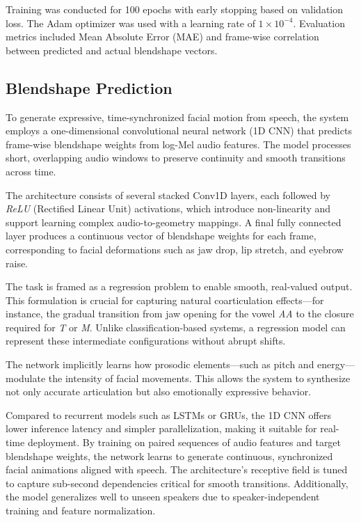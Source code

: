 \documentclass[runningheads]{llncs}
\begin{document}
Training was conducted for 100 epochs with early stopping based on validation loss. The Adam optimizer was used with a learning rate of $1 \times 10^{-4}$. Evaluation metrics included Mean Absolute Error (MAE) and frame-wise correlation between predicted and actual blendshape vectors.

\subsection{Blendshape Prediction}

To generate expressive, time-synchronized facial motion from speech, the system employs a one-dimensional convolutional neural network (1D CNN) that predicts frame-wise blendshape weights from log-Mel audio features. The model processes short, overlapping audio windows to preserve continuity and smooth transitions across time.

The architecture consists of several stacked Conv1D layers, each followed by \textit{ReLU} (Rectified Linear Unit) activations, which introduce non-linearity and support learning complex audio-to-geometry mappings. A final fully connected layer produces a continuous vector of blendshape weights for each frame, corresponding to facial deformations such as jaw drop, lip stretch, and eyebrow raise.

The task is framed as a regression problem to enable smooth, real-valued output. This formulation is crucial for capturing natural coarticulation effects—for instance, the gradual transition from jaw opening for the vowel \textit{AA} to the closure required for \textit{T} or \textit{M}. Unlike classification-based systems, a regression model can represent these intermediate configurations without abrupt shifts.

The network implicitly learns how prosodic elements—such as pitch and energy—modulate the intensity of facial movements. This allows the system to synthesize not only accurate articulation but also emotionally expressive behavior.

Compared to recurrent models such as LSTMs or GRUs, the 1D CNN offers lower inference latency and simpler parallelization, making it suitable for real-time deployment. By training on paired sequences of audio features and target blendshape weights, the network learns to generate continuous, synchronized facial animations aligned with speech. The architecture's receptive field is tuned to capture sub-second dependencies critical for smooth transitions. Additionally, the model generalizes well to unseen speakers due to speaker-independent training and feature normalization.
\end{document}
